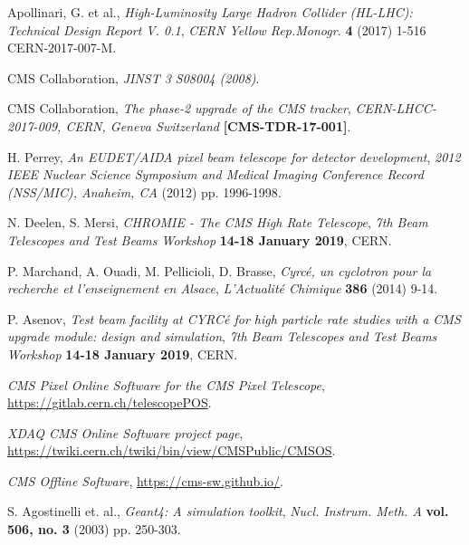 \documentclass[a4paper,11pt]{article}
\begin{document}
\begin{thebibliography}{99}
	
\justifying
		
Apollinari, G. et al., \emph{High-Luminosity Large Hadron Collider (HL-LHC): Technical Design Report V. 0.1}, \emph{CERN Yellow Rep.Monogr.} {\bf 4} (2017) 1-516 CERN-2017-007-M.

CMS Collaboration, \emph{JINST 3 S08004 (2008)}.

CMS Collaboration, \emph{The phase-2 upgrade of the CMS tracker}, \emph{CERN-LHCC-2017-009, CERN, Geneva Switzerland} {\bf [CMS-TDR-17-001]}.

H. Perrey, \emph{An EUDET/AIDA pixel beam telescope for detector development}, \emph{2012 IEEE Nuclear Science Symposium and Medical Imaging Conference Record (NSS/MIC), Anaheim, CA} (2012) pp. 1996-1998.

N. Deelen, S. Mersi, \emph{CHROMIE - The CMS High Rate Telescope}, \emph{7th Beam Telescopes and Test Beams Workshop} {\bf 14-18 January 2019}, CERN.

P. Marchand, A. Ouadi, M. Pellicioli, D. Brasse, \emph{Cyrcé, un cyclotron pour la recherche et l’enseignement en Alsace}, \emph{L’Actualité Chimique} {\bf 386} (2014) 9-14.

P. Asenov, \emph{Test beam facility at CYRCé for high particle rate studies with a CMS upgrade module: design and simulation}, \emph{7th Beam Telescopes and Test Beams Workshop} {\bf 14-18 January 2019}, CERN.

\emph{CMS Pixel Online Software for the CMS Pixel Telescope}, \href{https://gitlab.cern.ch/telescopePOS} {https://gitlab.cern.ch/telescopePOS}.

\emph{XDAQ CMS Online Software project page}, \href{https://twiki.cern.ch/twiki/bin/view/CMSPublic/CMSOS} {https://twiki.cern.ch/twiki/bin/view/CMSPublic/CMSOS}.

\emph{CMS Offline Software}, \href{https://cms-sw.github.io/} {https://cms-sw.github.io/}.

S. Agostinelli et. al., \emph{Geant4: A simulation toolkit}, \emph{Nucl. Instrum. Meth. A} {\bf vol. 506, no. 3} (2003) pp. 250-303.

\end{thebibliography}
\end{document}
